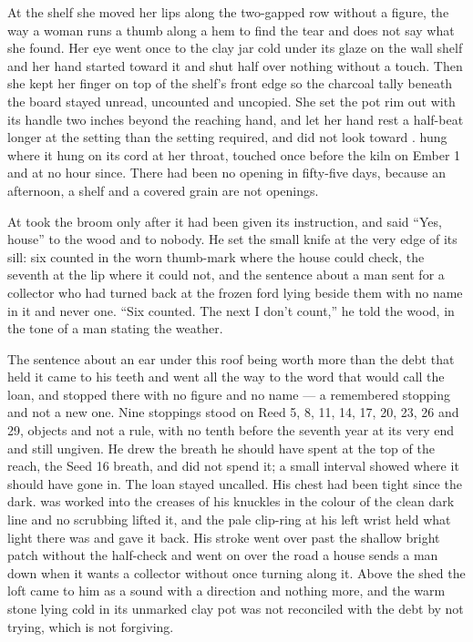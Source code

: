 At the shelf she moved her lips along the two-gapped row without a figure, the way a woman runs a thumb along a hem to find the tear and does not say what she found. Her eye went once to the clay jar cold under its glaze on the wall shelf and her hand started toward it and shut half over nothing without a touch. Then she kept her finger on top of the shelf's front edge so the charcoal tally beneath the board stayed unread, uncounted and uncopied. She set the pot rim out with its handle two inches beyond the reaching hand, and let her hand rest a half-beat longer at the setting than the setting required, and did not look toward .  hung where it hung on its cord at her throat, touched once before the kiln on Ember 1 and at no hour since. There had been no opening in fifty-five days, because an afternoon, a shelf and a covered grain are not openings.

At   took the broom only after it had been given its instruction, and said “Yes, house” to the wood and to nobody. He set the small knife at the very edge of its sill: six counted in the worn thumb-mark where the house could check, the seventh at the lip where it could not, and the sentence about a man sent for a collector who had turned back at the frozen ford lying beside them with no name in it and never one. “Six counted. The next I don't count,” he told the wood, in the tone of a man stating the weather.

The sentence about an ear under this roof being worth more than the debt that held it came to his teeth and went all the way to the word that would call the loan, and stopped there with no figure and no name --- a remembered stopping and not a new one. Nine stoppings stood on Reed 5, 8, 11, 14, 17, 20, 23, 26 and 29, objects and not a rule, with no tenth before the seventh year at its very end and still ungiven. He drew the breath he should have spent at the top of the reach, the Seed 16 breath, and did not spend it; a small interval showed where it should have gone in. The loan stayed uncalled. His chest had been tight since the dark.  was worked into the creases of his knuckles in the colour of the clean dark line and no scrubbing lifted it, and the pale clip-ring at his left wrist held what light there was and gave it back. His stroke went over  past the shallow bright patch without the half-check and went on over the road a house sends a man down when it wants a collector without once turning along it. Above the shed the loft came to him as a sound with a direction and nothing more, and the warm stone lying cold in its unmarked clay pot was not reconciled with the debt by not trying, which is not forgiving.

